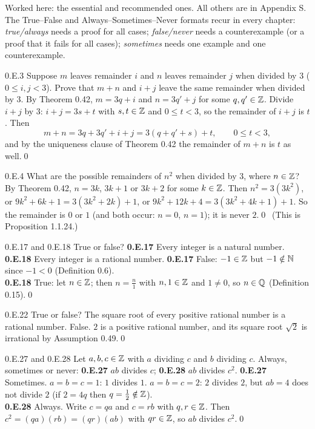 
Worked here: the essential and recommended ones. All others are in Appendix S. The True--False and Always--Sometimes--Never formats recur in every chapter: \emph{true/always} needs a proof for all cases; \emph{false/never} needs a counterexample (or a proof that it fails for all cases); \emph{sometimes} needs one example and one counterexample.

\begin{bookex}[essential]{0.E.3}
Suppose $m$ leaves remainder $i$ and $n$ leaves remainder $j$ when divided by $3$ ($0\le i,j<3$). Prove that $m+n$ and $i+j$ leave the same remainder when divided by $3$.
\solution
By Theorem 0.42, $m=3q+i$ and $n=3q'+j$ for some $q,q'\in\mathbb{Z}$. Divide $i+j$ by $3$: $i+j=3s+t$ with $s,t\in\mathbb{Z}$ and $0\le t<3$, so the remainder of $i+j$ is $t$. Then
\[
m+n=3q+3q'+i+j=3(q+q'+s)+t,\qquad 0\le t<3,
\]
and by the uniqueness clause of Theorem 0.42 the remainder of $m+n$ is $t$ as well.\qed
\end{bookex}

\begin{bookex}[essential]{0.E.4}
What are the possible remainders of $n^2$ when divided by $3$, where $n\in\mathbb{Z}$?
\solution
By Theorem 0.42, $n=3k$, $3k+1$ or $3k+2$ for some $k\in\mathbb{Z}$. Then $n^2=3(3k^2)$, or $9k^2+6k+1=3(3k^2+2k)+1$, or $9k^2+12k+4=3(3k^2+4k+1)+1$. So the remainder is $0$ or $1$ (and both occur: $n=0$, $n=1$); it is never $2$.\qed\ (This is Proposition 1.1.24.)
\end{bookex}

\begin{bookex}[recommended]{0.E.17 and 0.E.18}
True or false? \textbf{0.E.17} Every integer is a natural number. \textbf{0.E.18} Every integer is a rational number.
\solution
\textbf{0.E.17} False: $-1\in\mathbb{Z}$ but $-1\notin\mathbb{N}$ since $-1<0$ (Definition 0.6).\\
\textbf{0.E.18} True: let $n\in\mathbb{Z}$; then $n=\frac n1$ with $n,1\in\mathbb{Z}$ and $1\ne0$, so $n\in\mathbb{Q}$ (Definition 0.15).\qed
\end{bookex}

\begin{bookex}[essential]{0.E.22}
True or false? The square root of every positive rational number is a rational number.
\solution
False. $2$ is a positive rational number, and its square root $\sqrt2$ is irrational by Assumption 0.49.\qed
\end{bookex}

\begin{bookex}[essential]{0.E.27 and 0.E.28}
Let $a,b,c\in\mathbb{Z}$ with $a$ dividing $c$ and $b$ dividing $c$. Always, sometimes or never: \textbf{0.E.27} $ab$ divides $c$; \textbf{0.E.28} $ab$ divides $c^2$.
\solution
\textbf{0.E.27} Sometimes. $a=b=c=1$: $1$ divides $1$. $a=b=c=2$: $2$ divides $2$, but $ab=4$ does not divide $2$ (if $2=4q$ then $q=\frac12\notin\mathbb{Z}$).\\
\textbf{0.E.28} Always. Write $c=qa$ and $c=rb$ with $q,r\in\mathbb{Z}$. Then $c^2=(qa)(rb)=(qr)(ab)$ with $qr\in\mathbb{Z}$, so $ab$ divides $c^2$.\qed
\end{bookex}

